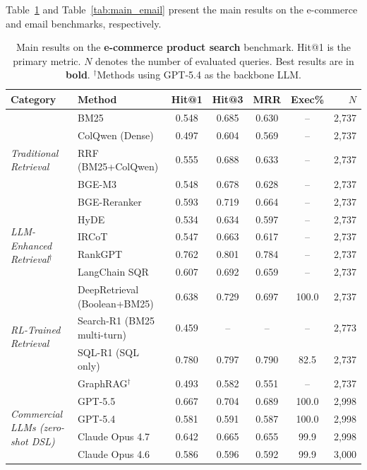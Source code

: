 \documentclass[11pt]{article}
\begin{document}
Table~\ref{tab:main_ecommerce} and Table~\ref{tab:main_email} present the main results on the e-commerce and email benchmarks, respectively.

\begin{table}[t]
\centering
\small
\caption{Main results on the \textbf{e-commerce product search} benchmark. Hit@1 is the primary metric. $N$ denotes the number of evaluated queries. Best results are in \textbf{bold}. $^\dagger$Methods using GPT-5.4 as the backbone LLM.}
\label{tab:main_ecommerce}
\begin{tabular}{llccccr}
\toprule
\textbf{Category} & \textbf{Method} & \textbf{Hit@1} & \textbf{Hit@3} & \textbf{MRR} & \textbf{Exec\%} & \textbf{$N$} \\
\midrule
\multirow{5}{*}{\textit{Traditional Retrieval}}
& BM25 & 0.548 & 0.685 & 0.630 & -- & 2{,}737 \\
& ColQwen (Dense) & 0.497 & 0.604 & 0.569 & -- & 2{,}737 \\
& RRF (BM25+ColQwen) & 0.555 & 0.688 & 0.633 & -- & 2{,}737 \\
& BGE-M3 & 0.548 & 0.678 & 0.628 & -- & 2{,}737 \\
& BGE-Reranker & 0.593 & 0.719 & 0.664 & -- & 2{,}737 \\
\midrule
\multirow{4}{*}{\textit{LLM-Enhanced Retrieval$^\dagger$}}
& HyDE & 0.534 & 0.634 & 0.597 & -- & 2{,}737 \\
& IRCoT & 0.547 & 0.663 & 0.617 & -- & 2{,}737 \\
& RankGPT & 0.762 & 0.801 & 0.784 & -- & 2{,}737 \\
& LangChain SQR & 0.607 & 0.692 & 0.659 & -- & 2{,}737 \\
\midrule
\multirow{4}{*}{\textit{RL-Trained Retrieval}}
& DeepRetrieval (Boolean+BM25) & 0.638 & 0.729 & 0.697 & 100.0 & 2{,}737 \\
& Search-R1 (BM25 multi-turn) & 0.459 & -- & -- & -- & 2{,}773 \\
& SQL-R1 (SQL only) & 0.780 & 0.797 & 0.790 & 82.5 & 2{,}737 \\
& GraphRAG$^\dagger$ & 0.493 & 0.582 & 0.551 & -- & 2{,}737 \\
\midrule
\multirow{5}{*}{\textit{Commercial LLMs (zero-shot DSL)}}
& GPT-5.5 & 0.667 & 0.704 & 0.689 & 100.0 & 2{,}998 \\
& GPT-5.4 & 0.581 & 0.591 & 0.587 & 100.0 & 2{,}998 \\
& Claude Opus 4.7 & 0.642 & 0.665 & 0.655 & 99.9 & 2{,}998 \\
& Claude Opus 4.6 & 0.586 & 0.596 & 0.592 & 99.9 & 3{,}000 \\

\end{tabular}
\end{table}
\end{document}
